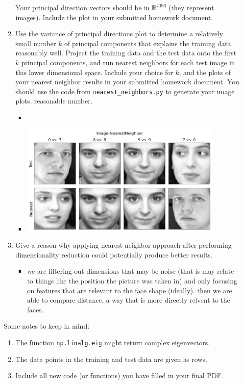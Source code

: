 \documentclass[12pt,twoside]{article}
\begin{document}
\begin{enumerate}
\begin{enumerate}
Your principal direction vectors should be in $\mathbb{R}^{4096}$ (they represent images).
Include the plot in your submitted homework document.
\item Use the variance of principal directions plot to determine a 
relatively small number $k$ of principal components
that explains the training data reasonably well.
Project the training data 
and the test data onto the
first $k$ principal components, and run nearest neighbors for
each test image in this lower dimensional space.  Include your
choice for $k$, and the plots
of your nearest neighbor results in your submitted homework
document.  You should use the code from
 \verb|nearest_neighbors.py| to generate your image plots.
reasonable number.
\begin{itemize}
\item \inputminted[firstline=92, lastline=124, breaklines=True]{python}{hw9.py}
\item \includegraphics[width=10cm]{homework/homework_9/images/hw9_3.png}
\end{itemize}
 
\item Give a reason why applying 
nearest-neighbor approach after performing dimensionality reduction could potentially produce better results.
\begin{itemize}
    \item we are filtering out dimensions that may be noise (that is may relate to things like the position the picture was taken in) and only focusing on features that are relevant to the face shape (ideally). then we are able to compare distance, a way that is more directly relvent to the faces.
\end{itemize}


\end{enumerate}

  Some notes to keep in mind:
  \begin{enumerate}
  \item The function {\tt np.linalg.eig} might return complex eigenvectors.
  \item The data points in the training and test data are given as
    rows.
    \item Include all new code (or functions) you have filled in your final PDF.
 \end{enumerate}

 \end{enumerate}
 
\end{document}
